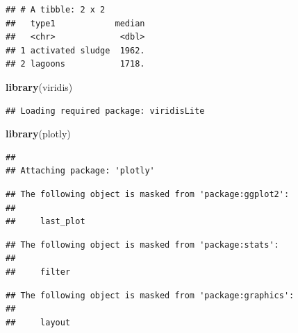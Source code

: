 \documentclass[
]{article}
\newenvironment{Shaded}{\begin{snugshade}}{\end{snugshade}}
\newcommand{\KeywordTok}[1]{\textcolor[rgb]{0.13,0.29,0.53}{\textbf{#1}}}
\newcommand{\NormalTok}[1]{#1}
\begin{document}
\begin{verbatim}
## # A tibble: 2 x 2
##   type1            median
##   <chr>             <dbl>
## 1 activated sludge  1962.
## 2 lagoons           1718.
\end{verbatim}

\begin{Shaded}
\begin{Highlighting}[]
\KeywordTok{library}\NormalTok{(viridis)}
\end{Highlighting}
\end{Shaded}

\begin{verbatim}
## Loading required package: viridisLite
\end{verbatim}

\begin{Shaded}
\begin{Highlighting}[]
\KeywordTok{library}\NormalTok{(plotly)}
\end{Highlighting}
\end{Shaded}

\begin{verbatim}
## 
## Attaching package: 'plotly'
\end{verbatim}

\begin{verbatim}
## The following object is masked from 'package:ggplot2':
## 
##     last_plot
\end{verbatim}

\begin{verbatim}
## The following object is masked from 'package:stats':
## 
##     filter
\end{verbatim}

\begin{verbatim}
## The following object is masked from 'package:graphics':
## 
##     layout
\end{verbatim}
\end{document}
